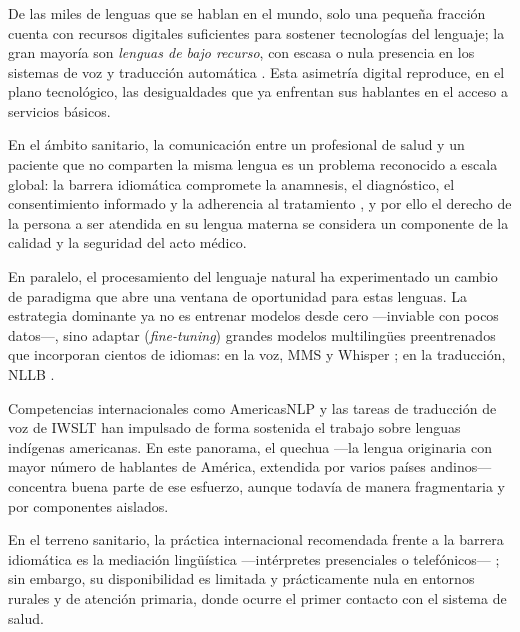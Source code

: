 \subsubsection{}
\begin{bloqueObsDos}
\noindent De las miles de lenguas que se hablan en el mundo, solo una peque{\~n}a fracci{\'o}n cuenta
con recursos digitales suficientes para sostener tecnolog{\'i}as del lenguaje; la gran mayor{\'i}a
son \emph{lenguas de bajo recurso}, con escasa o nula presencia en los sistemas de voz y
traducci{\'o}n autom{\'a}tica \parencite{joshi2020diversity}. Esta asimetr{\'i}a digital reproduce, en
el plano tecnol{\'o}gico, las desigualdades que ya enfrentan sus hablantes en el acceso a servicios
b{\'a}sicos.

\noindent En el {\'a}mbito
sanitario, la comunicaci{\'o}n entre un profesional de salud y un paciente que no comparten la misma
lengua es un problema reconocido a escala global: la barrera idiom{\'a}tica compromete la
anamnesis, el diagn{\'o}stico, el consentimiento informado y la adherencia al tratamiento
\parencite{alshamsi2020barreras}, y por ello el derecho de la persona a ser atendida en su lengua
materna se considera un componente de la calidad y la seguridad del acto m{\'e}dico.

\noindent En paralelo, el procesamiento del lenguaje natural ha experimentado un cambio de
paradigma que abre una ventana de oportunidad para estas lenguas. La estrategia dominante ya no es
entrenar modelos desde cero ---inviable con pocos datos---, sino adaptar (\emph{fine-tuning})
grandes modelos multiling{\"u}es preentrenados que incorporan cientos de idiomas: en la voz, MMS
\parencite{pratap2024mms} y Whisper \parencite{radford2023whisper}; en la traducci{\'o}n, NLLB
\parencite{costajussa2022nllb}.

\noindent Competencias internacionales como AmericasNLP
\parencite{mager2021americasnlp} y las tareas de traducci{\'o}n de voz de IWSLT
\parencite{Ortega2025260} han impulsado de forma sostenida el trabajo sobre lenguas ind{\'i}genas
americanas. En este panorama, el quechua ---la lengua originaria con mayor n{\'u}mero de hablantes
de Am{\'e}rica, extendida por varios pa{\'i}ses andinos--- concentra buena parte de ese esfuerzo,
aunque todav{\'i}a de manera fragmentaria y por componentes aislados.

\noindent En el terreno sanitario, la pr{\'a}ctica internacional recomendada frente a la barrera
idiom{\'a}tica es la mediaci{\'o}n ling{\"u}{\'i}stica ---int{\'e}rpretes presenciales o
telef{\'o}nicos--- \parencite{alshamsi2020barreras}; sin embargo, su disponibilidad es limitada y
pr{\'a}cticamente nula en entornos rurales y de atenci{\'o}n primaria, donde ocurre el primer
contacto con el sistema de salud.


\end{bloqueObsDos}
